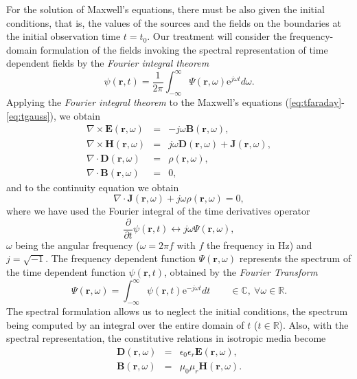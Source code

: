 \par For the solution of Maxwell's equations, there must be also given the initial conditions, that is, the values of the sources and the fields on the boundaries at the initial observation time $t=t_0$. Our treatment will consider the frequency-domain formulation of the fields invoking the spectral representation of time dependent fields by the \textit{Fourier integral theorem}  $${\psi}(\mathbf{r},t) = \frac{1}{2\pi} \int_{-\infty}^{\infty} {\Psi} (\mathbf{r}, \omega) \mathrm{e}^{j\omega t} d\omega.$$ Applying the \textit{Fourier integral theorem} to the Maxwell's equations (\ref{eq:tfaraday}-\ref{eq:tgauss}), we obtain
\begin{eqnarray}
\nabla \times {\mathbf{E}}(\mathbf{r},\omega) &= & -j\omega{\mathbf{B}}(\mathbf{r},\omega), \label{eq:ffaraday} \\
\nabla \times {\mathbf{H}}(\mathbf{r},\omega) &= & j\omega{\mathbf{D}}(\mathbf{r},\omega) + {\mathbf{J}}(\mathbf{r},\omega), \label{eq:fampere} \\
\nabla \cdot {\mathbf{D}}(\mathbf{r},\omega) &= & {\rho}(\mathbf{r},\omega), \label{eq:fpoisson}\\
\nabla \cdot {\mathbf{B}}(\mathbf{r},\omega) &= & 0,\label{eq:fgauss}
\end{eqnarray}
and to the continuity equation we obtain
\begin{equation}
\nabla \cdot {\mathbf{J}}(\mathbf{r},\omega) + j \omega {\rho}(\mathbf{r},\omega) = 0, \label{eq:contJ}
\end{equation}
where we have used the Fourier integral of the time derivatives operator $$\frac{\partial}{\partial{t}}{\psi}(\mathbf{r},t) \leftrightarrow j\omega {\Psi} (\mathbf{r}, \omega),$$
$\omega$ being the angular frequency ($\omega = 2 \pi f$ with $f$ the frequency in $\mathrm{Hz}$) and $j = \sqrt{-1}$. The frequency dependent function ${\Psi}(\mathbf{r},\omega)$ represents the spectrum of the time dependent function ${\psi}(\mathbf{r},t)$, obtained by the \textit{Fourier Transform} $${\Psi} (\mathbf{r}, \omega) = \int_{-\infty}^{\infty} {\psi}(\mathbf{r},t) \mathrm{e}^{-j\omega t} dt \qquad \in \mathbb{C}, \ \forall \omega \in \mathbb{R}.$$ 
The spectral formulation allows us to neglect the initial conditions, the spectrum being computed by an integral over the entire domain of $t$ ($t \in \mathbb{R}$).
Also, with the spectral representation, the constitutive relations in isotropic media become
\begin{eqnarray} 
{\mathbf{D}}(\mathbf{r},\omega) &= & \epsilon_0 \epsilon_r {\mathbf{E}}(\mathbf{r},\omega),  \label{eq:ffsconst1}\\
{\mathbf{B}}(\mathbf{r},\omega) &= & \mu_0 \mu_r {\mathbf{H}}(\mathbf{r},\omega). \label{eq:ffsconst2}
\end{eqnarray}


